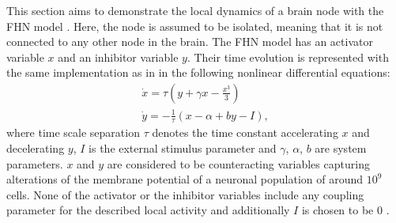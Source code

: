 This section aims to demonstrate the local dynamics of a brain node with the FHN model \citep{FIT61, NAG62}. Here, the node is assumed to be isolated, meaning that it is not connected to any other node in the brain. The FHN model has an activator variable $x$ and an inhibitor variable $y$. Their time evolution is represented with the same implementation as in \citep{GHO08, GHO08a} in the following nonlinear differential equations:
\begin{subequations}
\begin{align}\dot{x} = \tau \left( y + \gamma x - \frac{x^3}{3} \right)  \label{eqn: frobenius 1}\\  \dot{y} = -\frac{1}{\tau} (x - \alpha + b y - I ) , \label{eqn: frobenius 2}   \end{align} 
\end{subequations}
where time scale separation $\tau$ denotes the time constant accelerating $x$ and decelerating $y$, $I$ is the external stimulus parameter and $\gamma$, $\alpha$, $b$ are system parameters. $x$ and $y$ are considered to be counteracting variables capturing alterations of the membrane potential of a neuronal population of around $10^9$ cells. None of the activator or the inhibitor variables include any coupling parameter for the described local activity and additionally $I$ is chosen to be 0 \citep{GHO08}.

